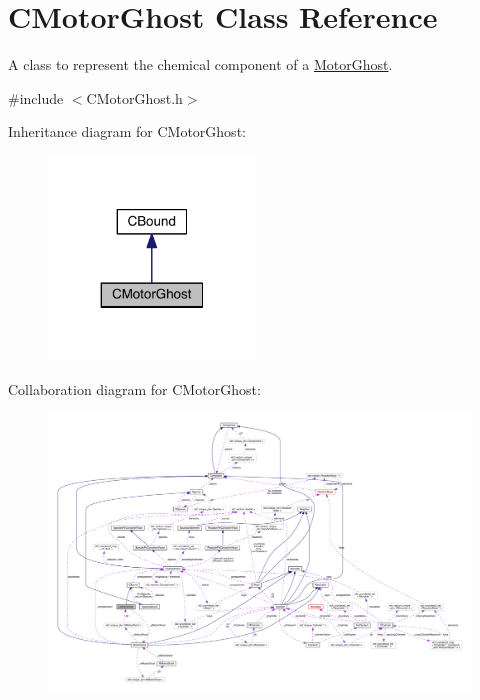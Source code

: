 \hypertarget{classCMotorGhost}{\section{C\+Motor\+Ghost Class Reference}
\label{classCMotorGhost}
}


A class to represent the chemical component of a \hyperlink{classMotorGhost}{Motor\+Ghost}.  




{\ttfamily \#include $<$C\+Motor\+Ghost.\+h$>$}



Inheritance diagram for C\+Motor\+Ghost\+:\nopagebreak
\begin{figure}[H]
\begin{center}
\leavevmode
\includegraphics[width=155pt]{classCMotorGhost__inherit__graph}
\end{center}
\end{figure}


Collaboration diagram for C\+Motor\+Ghost\+:
\nopagebreak
\begin{figure}[H]
\begin{center}
\leavevmode
\includegraphics[width=350pt]{classCMotorGhost__coll__graph}
\end{center}
\end{figure}
